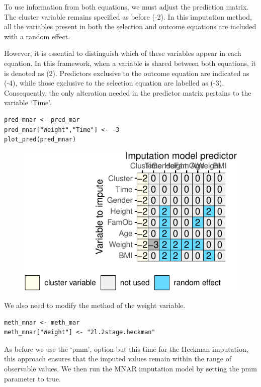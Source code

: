 \documentclass[
  article]{jss}
\begin{document}
To use information from both equations, we must adjust the prediction
matrix. The cluster variable remains specified as before (-2). In this
imputation method, all the variables present in both the selection and
outcome equations are included with a random effect.

However, it is essential to distinguish which of these variables appear
in each equation. In this framework, when a variable is shared between
both equations, it is denoted as (2). Predictors exclusive to the
outcome equation are indicated as (-4), while those exclusive to the
selection equation are labelled as (-3). Consequently, the only
alteration needed in the predictor matrix pertains to the variable
`Time'.

\begin{verbatim}
pred_mnar <- pred_mar
pred_mnar["Weight","Time"] <- -3
plot_pred(pred_mnar)
\end{verbatim}

\begin{figure}[h]

{\centering \includegraphics{manuscript_files/figure-pdf/obesity-predmnar-1.pdf}

}

\end{figure}

We also need to modify the method of the weight variable.

\begin{verbatim}
meth_mnar <- meth_mar
meth_mnar["Weight"] <- "2l.2stage.heckman"
\end{verbatim}

As before we use the `pmm', option but this time for the Heckman
imputation, this approach ensures that the imputed values remain within
the range of observable values. We then run the MNAR imputation model by
setting the pmm parameter to true.
\end{document}
